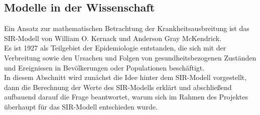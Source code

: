 \subsection{Modelle in der Wissenschaft}
Ein Ansatz zur mathematischen Betrachtung der Krankheitsausbreitung ist das SIR-Modell von William O. Kernack und Anderson Gray McKendrick.\\
Es ist 1927 als Teilgebiet der Epidemiologie entstanden, die sich mit der Verbreitung sowie den Ursachen und Folgen von gesundheitsbezogenen Zuständen und Ereignissen in Bevölkerungen oder Populationen beschäftigt.\\
In diesem Abschnitt wird zunächst die Idee hinter dem SIR-Modell vorgestellt, dann die Berechnung der Werte des SIR-Modells erklärt und abschließend aufbauend darauf die Frage beantwortet, warum sich im Rahmen des Projektes überhaupt für das SIR-Modell entschieden wurde.

